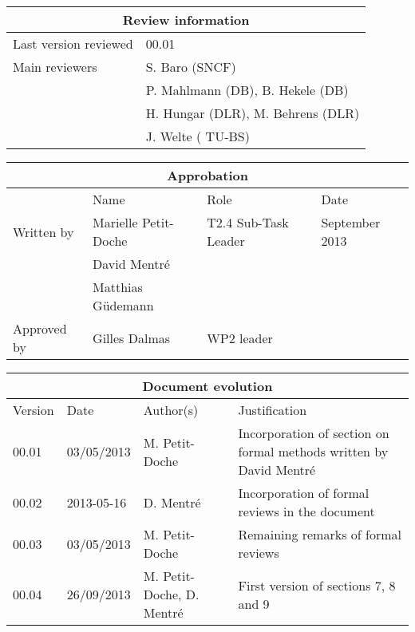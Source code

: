 \documentclass{template/openetcs_article}
\begin{document}
\begin{tabular}{|p{4.4cm}|p{8.7cm}|}
\hline
\multicolumn{2}{|c|}{Review information} \\
\hline
Last version reviewed & 00.01 \\
\hline
Main reviewers & S. Baro (SNCF) \\
& P. Mahlmann (DB), B. Hekele (DB)\\
& H. Hungar (DLR), M. Behrens (DLR) \\
& J. Welte ( TU-BS) \\
\hline
\end{tabular}

\begin{tabular}{|p{2.2cm}|p{4cm}|p{4cm}|p{2cm}|}
\hline
\multicolumn{4}{|c|}{Approbation} \\
\hline
  &  Name & Role & Date   \\
\hline  
Written by    &  Marielle Petit-Doche & T2.4 Sub-Task Leader  & September 2013 \\
& David Mentré & & \\
& Matthias Güdemann & & \\
\hline
Approved by & Gilles Dalmas & WP2 leader & \\
\hline
\end{tabular}

\begin{tabular}{|p{2.2cm}|p{2cm}|p{3cm}|p{5cm}|}
\hline
\multicolumn{4}{|c|}{Document evolution} \\
\hline
Version &  Date & Author(s) & Justification  \\
\hline  
00.01 & 03/05/2013 & M. Petit-Doche &  Incorporation of section on formal methods written by David Mentré \\
\hline  
00.02 & 2013-05-16 & D. Mentré &  Incorporation of formal reviews in
the document \\
\hline  
00.03 & 03/05/2013 & M. Petit-Doche &  Remaining remarks of formal reviews \\
\hline  
00.04 & 26/09/2013 & M. Petit-Doche, D. Mentré & First version of sections 7, 8 and 9   \\
\hline  

\end{tabular}




\newcommand{\tbd}{\colorbox{cyan}{\%\%To Be Defined\%\%}}
\newcommand{\tbc}{\colorbox{cyan}{\%\%To Be Confirmed\%\%}}
\newcommand{\todo}[1]{\colorbox{cyan}{\%\%{#1}\%\%}}
\newlength{\origindent}
\end{document}
